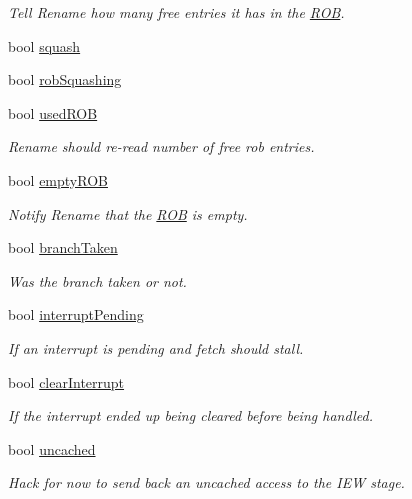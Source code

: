 \begin{DoxyCompactItemize}
\begin{DoxyCompactList}\small\item\em Tell Rename how many free entries it has in the \hyperlink{classROB}{ROB}. \item\end{DoxyCompactList}\item 
bool \hyperlink{structTimeBufStruct_1_1commitComm_a61b7f55a2e0399c2eee9f78204b37d8c}{squash}
\item 
bool \hyperlink{structTimeBufStruct_1_1commitComm_a897a27c9efdd9f32d97a34a08a529cfc}{robSquashing}
\item 
bool \hyperlink{structTimeBufStruct_1_1commitComm_a7947bc5bf9b7709eeb835c213e0d6c36}{usedROB}
\begin{DoxyCompactList}\small\item\em Rename should re-\/read number of free rob entries. \item\end{DoxyCompactList}\item 
bool \hyperlink{structTimeBufStruct_1_1commitComm_a145243270bb508720c507e02ad0a8e6a}{emptyROB}
\begin{DoxyCompactList}\small\item\em Notify Rename that the \hyperlink{classROB}{ROB} is empty. \item\end{DoxyCompactList}\item 
bool \hyperlink{structTimeBufStruct_1_1commitComm_abea53a673db4866c41444561cbc6dac0}{branchTaken}
\begin{DoxyCompactList}\small\item\em Was the branch taken or not. \item\end{DoxyCompactList}\item 
bool \hyperlink{structTimeBufStruct_1_1commitComm_a310de3efc6b60f47de5792d2b00d0840}{interruptPending}
\begin{DoxyCompactList}\small\item\em If an interrupt is pending and fetch should stall. \item\end{DoxyCompactList}\item 
bool \hyperlink{structTimeBufStruct_1_1commitComm_a695ef2b5d408e6ca8b4a3019293ec106}{clearInterrupt}
\begin{DoxyCompactList}\small\item\em If the interrupt ended up being cleared before being handled. \item\end{DoxyCompactList}\item 
bool \hyperlink{structTimeBufStruct_1_1commitComm_aab896ca9f63476ee85c0cac2bbff0811}{uncached}
\begin{DoxyCompactList}\small\item\em Hack for now to send back an uncached access to the IEW stage. \item\end{DoxyCompactList}\end{DoxyCompactItemize}
